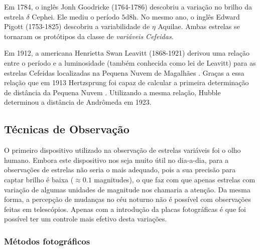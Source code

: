 Em 1784, o inglês Jonh Goodricke (1764-1786) descobriu a variação no brilho da estrela $\delta$ Cephei. Ele mediu o período $5\si{\day}8\si{\hour}$. No mesmo ano, o inglês Edward Pigott (1753-1825) descobriu a variabilidade de $\eta$ Aquilae. Ambas estrelas se tornaram os protótipos da classe de \textit{variáveis Cefeidas}.

Em 1912, a americana Henrietta Swan Leavitt (1868-1921) derivou uma relação entre o período e a luminosidade (também conhecida como lei de Leavitt) para as estrelas Cefeidas localizadas na Pequena Nuvem de Magalhães \citep{Leavitt1912}. Graças a essa relação que em 1913 Hertzsprung foi capaz de calcular a primeira determinação de distância da Pequena Nuvem \citep{Hertzsprung1913}. Utilizando a mesma relação, Hubble determinou a distância de Andrômeda em 1923.


\subsection{Técnicas de Observação}

O primeiro dispositivo utilizado na observação de estrelas variáveis foi o olho humano.
Embora este dispositivo nos seja muito útil no dia-a-dia, para a observações de estrelas não seria o mais adequado, pois a sua precisão para captar brilho é baixa ($\approx 0.1$ magnitudes), o que faz com que apenas estrelas com variação de algumas unidades de magnitude nos chamaria a atenção. Da mesma forma, a percepção de mudanças no céu noturno não é possível com observações feitas em telescópios. Apenas com a introdução da placas fotográficas é que foi possível ter um controle mais efetivo desta variações.

\subsubsection{Métodos fotográficos}

